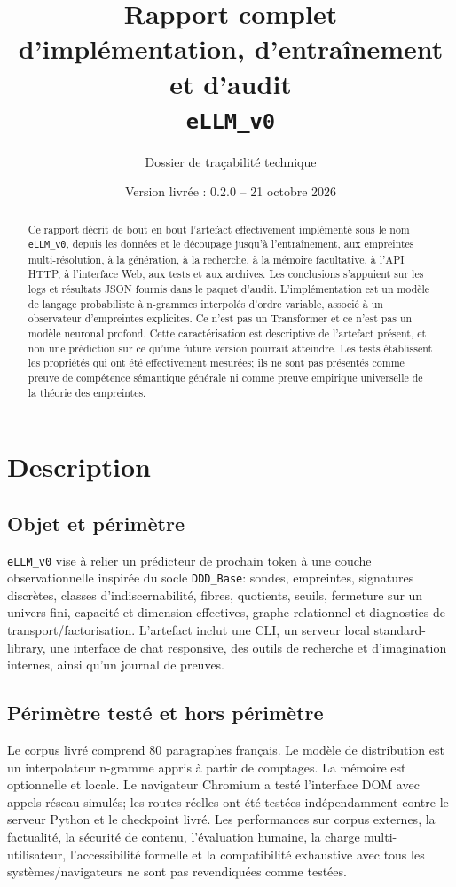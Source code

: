 \documentclass[11pt,a4paper]{article}
\title{Rapport complet d'implémentation, d'entraînement et d'audit\\\texttt{eLLM\_v0}}
\author{Dossier de traçabilité technique}
\date{Version livrée : 0.2.0 -- 21 octobre 2026}
\begin{document}
\maketitle
\begin{abstract}
Ce rapport décrit de bout en bout l'artefact effectivement implémenté sous le nom \texttt{eLLM\_v0}, depuis les données et le découpage jusqu'à l'entraînement, aux empreintes multi-résolution, à la génération, à la recherche, à la mémoire facultative, à l'API HTTP, à l'interface Web, aux tests et aux archives. Les conclusions s'appuient sur les logs et résultats JSON fournis dans le paquet d'audit. L'implémentation est un modèle de langage probabiliste à n-grammes interpolés d'ordre variable, associé à un observateur d'empreintes explicites. Ce n'est pas un Transformer et ce n'est pas un modèle neuronal profond. Cette caractérisation est descriptive de l'artefact présent, et non une prédiction sur ce qu'une future version pourrait atteindre. Les tests établissent les propriétés qui ont été effectivement mesurées; ils ne sont pas présentés comme preuve de compétence sémantique générale ni comme preuve empirique universelle de la théorie des empreintes.
\end{abstract}
\tableofcontents
\section{Description}
\subsection{Objet et périmètre}
\texttt{eLLM\_v0} vise à relier un prédicteur de prochain token à une couche observationnelle inspirée du socle \texttt{DDD\_Base}: sondes, empreintes, signatures discrètes, classes d'indiscernabilité, fibres, quotients, seuils, fermeture sur un univers fini, capacité et dimension effectives, graphe relationnel et diagnostics de transport/factorisation. L'artefact inclut une CLI, un serveur local standard-library, une interface de chat responsive, des outils de recherche et d'imagination internes, ainsi qu'un journal de preuves.
\subsection{Périmètre testé et hors périmètre}
Le corpus livré comprend 80 paragraphes français. Le modèle de distribution est un interpolateur n-gramme appris à partir de comptages. La mémoire est optionnelle et locale. Le navigateur Chromium a testé l'interface DOM avec appels réseau simulés; les routes réelles ont été testées indépendamment contre le serveur Python et le checkpoint livré. Les performances sur corpus externes, la factualité, la sécurité de contenu, l'évaluation humaine, la charge multi-utilisateur, l'accessibilité formelle et la compatibilité exhaustive avec tous les systèmes/navigateurs ne sont pas revendiquées comme testées.
\end{document}
